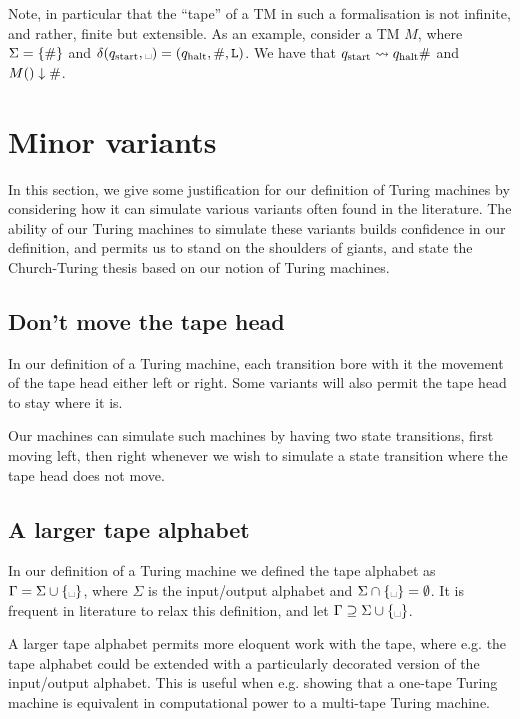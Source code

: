 Note, in particular that the ``tape'' of a TM in such a formalisation is not
infinite, and rather, finite but extensible. As an example, consider a TM $M$,
where $\Sigma=\mathopen{}\left\{{\mathtt{\#}}\right\}\mathclose{}$ and $\delta\p{\qstart, \blank} =
\p{\qhalt,\#,\goleft}$. We have that $q_{\text{start}}\leadsto q_{\text{halt}}\#$ and
$M\mathopen{}\left({}\right)\mathclose{}\downarrow\#$.

\section{Minor variants}

In this section, we give some justification for our definition of Turing
machines by considering how it can simulate various variants often found in the
literature. The ability of our Turing machines to simulate these variants
builds confidence in our definition, and permits us to stand on the shoulders
of giants, and state the Church-Turing thesis based on our notion of Turing
machines.

\subsection{Don't move the tape head}

In our definition of a Turing machine, each transition bore with it the
movement of the tape head either left or right. Some variants will also permit
the tape head to stay where it is. 

Our machines can simulate such machines by having two state transitions, first
moving left, then right whenever we wish to simulate a state transition where
the tape head does not move.

\subsection{A larger tape alphabet}

In our definition of a Turing machine we defined the tape alphabet as $\Gamma =
\Sigma \cup \set{\blank}$, where $\Sigma$ is the input/output alphabet and
$\Sigma \cap \set{\blank} = \emptyset$. It is frequent in literature to relax
this definition, and let $\Gamma \supseteq \Sigma \cup \set{\blank}$.

A larger tape alphabet permits more eloquent work with the tape, where e.g. the
tape alphabet could be extended with a particularly decorated version of the
input/output alphabet. This is useful when e.g. showing that a one-tape Turing
machine is equivalent in computational power to a multi-tape Turing machine.

